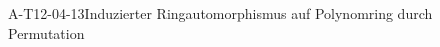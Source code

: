 
\begin{REM}{A-T12-04-13}{Induzierter Ringautomorphismus auf Polynomring durch Permutation}
\end{REM}
